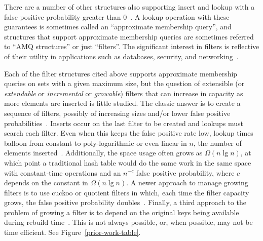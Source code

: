 \documentclass[letterpaper,twocolumn,10pt]{article}
\begin{document}
There are a number of other structures also supporting insert and lookup with a false positive probability greater than 0~\cite{vacuum,morton-journal,ribbon,xor-filter,quotient-filter,broom,vector-quotient}.
A lookup operation with these guarantees is sometimes called an ``approximate membership query'', and structures that support approximate membership queries are sometimes referred to ``AMQ structures'' or just ``filters''.
The significant interest in filters is reflective of their utility in applications such as databases, security, and networking~\cite{split-bloom, vacuum, quotient-filter, malware, profile-similarity, invertible, flooding-filter, summary-cache, prefix-matching-filter}.


Each of the filter structures cited above supports approximate membership queries on sets with a given maximum size, but the question of extensible (or {\itshape extendable} or {\itshape incremental} or {\itshape growable}) filters that can increase in capacity as more elements are inserted is little studied.
The classic answer is to create a sequence of filters, possibly of increasing sizes and/or lower false positive probabilities~\cite{dynamic-bloom,scalable-bloom,dynamic-cuckoo}.
Inserts occur on the last filter to be created and lookups must search each filter.
Even when this keeps the false positive rate low, lookup times balloon from constant to poly-logarithmic or even linear in $n$, the number of elements inserted~\cite{psw,logarithm,consistent-cuckoo}. %
Additionally, the space usage often grows as $\Omega(n \lg n)$, at which point a traditional hash table would do the same work in the same space with constant-time operations and an $n^{-c}$ false positive probability, where $c$ depends on the constant in $\Omega(n \lg n)$.
A newer approach to manage growing filters is to use cuckoo or quotient filters in which, each time the filter capacity grows, the false positive probability doubles~\cite{logarithm,morton-journal,vacuum,rsqf,entry-extensible}.
Finally, a third approach to the problem of growing a filter is to depend on the original keys being available during rebuild time~\cite{elastic}.
This is not always possible, or, when possible, may not be time efficient.
See Figure~\ref{prior-work-table}.
\end{document}
